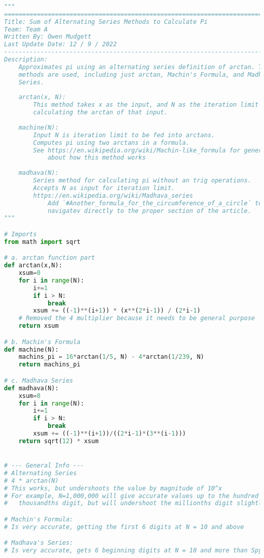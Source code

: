 \documentclass[11pt]{article}
\begin{document}
\begin{lstlisting}[language=Python]
	
"""
===============================================================================
Title: Sum of Alternating Series Methods to Calculate Pi
Team: Team A
Written By: Owen Mudgett
Last Update Date: 12 / 9 / 2022
-------------------------------------------------------------------------------
Description:
    Approximates pi using an alternating series definition of arctan. Three
    methods are used, including just arctan, Machin's Formula, and Madhava's
    Series.
    
    arctan(x, N):
        This method takes x as the input, and N as the iteration limit for
        calculating the arctan of that input.
        
    machine(N):
        Input N is iteration limit to be fed into arctans.
        Computes pi using two arctans in a formula.
        See https://en.wikipedia.org/wiki/Machin-like_formula for general info
            about how this method works
            
    madhava(N):
        Series method for calculating pi without an trig operations.
        Accepts N as input for iteration limit.
        https://en.wikipedia.org/wiki/Madhava_series
            Add `#Another_formula_for_the_circumference_of_a_circle` to 
            navigatev directly to the proper section of the article.
"""

# Imports
from math import sqrt

# a. arctan function part
def arctan(x,N):
    xsum=0
    for i in range(N):
        i+=1
        if i > N:
            break
        xsum += ((-1)**(i+1)) * (x**(2*i-1)) / (2*i-1)
    # Removed the 4 multiplier because it needs to be general purpose
    return xsum  

# b. Machin's Formula
def machine(N):
    machins_pi = 16*arctan(1/5, N) - 4*arctan(1/239, N)
    return machins_pi 

# c. Madhava Series
def madhava(N):
    xsum=0
    for i in range(N):
        i+=1
        if i > N:
            break
        xsum += ((-1)**(i+1))/((2*i-1)*(3**(i-1)))
    return sqrt(12) * xsum


# --- General Info ---
# Alternating Series
# 4 * arctan(N)
# This works, but undershoots the value by magnitude of 10^x
# For example, N=1,000,000 will give accurate values up to the hundred 
#   thousandths digit, but will undershoot the millionths digit slightly

# Machin's Formula:
# Is very accurate, getting the first 6 digits at N = 10 and above

# Madhava's Series:
# Is very accurate, gets 6 beginning digits at N = 10 and more than Spyder can display correct at N = 100
\end{lstlisting}
\end{document}
